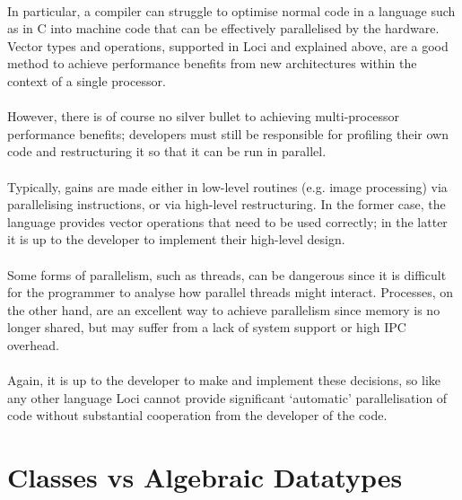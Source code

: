 \documentclass[12pt,twoside,notitlepage]{report}
\begin{document}
\paragraph{}
In particular, a compiler can struggle to optimise normal code in a language such as in C into machine code that can be effectively parallelised by the hardware. Vector types and operations, supported in Loci and explained above, are a good method to achieve performance benefits from new architectures within the context of a single processor.

\paragraph{}
However, there is of course no silver bullet to achieving multi-processor performance benefits; developers must still be responsible for profiling their own code and restructuring it so that it can be run in parallel.

\paragraph{}
Typically, gains are made either in low-level routines (e.g. image processing) via parallelising instructions, or via high-level restructuring. In the former case, the language provides vector operations that need to be used correctly; in the latter it is up to the developer to implement their high-level design.

\paragraph{}
Some forms of parallelism, such as threads, can be dangerous since it is difficult for the programmer to analyse how parallel threads might interact. Processes, on the other hand, are an excellent way to achieve parallelism since memory is no longer shared, but may suffer from a lack of system support or high IPC overhead.

\paragraph{}
Again, it is up to the developer to make and implement these decisions, so like any other language Loci cannot provide significant `automatic' parallelisation of code without substantial cooperation from the developer of the code.

\section{Classes vs Algebraic Datatypes}
\end{document}
